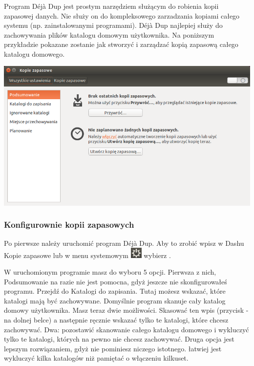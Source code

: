 Program \textcolor{ubuntu_orange}{Déjà Dup} jest prostym narzędziem służącym do robienia kopii zapasowej danych. Nie służy on do kompleksowego zarzadzania kopiami całego systemu (np. zainstalowanymi programami). Déjà Dup najlepiej służy do zachowywania plików katalogu domowym użytkownika. Na poniższym przykładzie pokazane zostanie jak stworzyć i zarządzać kopią zapasową całego katalogu domowego.

\begin{center}
	\includegraphics[width=\linewidth]{images/programy_dejavu1.png}
\end{center}

\subsubsection{Konfigurownie kopii zapasowych}
Po pierwsze należy uruchomić program Déjà Dup. Aby to zrobić wpisz w Dashu \textcolor{ubuntu_orange}{Kopie zapasowe} lub w menu systemowym \includegraphics{images/ikony_zasilanie.png} wybierz .

W uruchomionym programie masz do wyboru 5 opcji. Pierwsza z nich, \textcolor{ubuntu_orange}{Podsumowanie} na razie nie jest pomocna, gdyż jeszcze nie skonfigurowałeś programu. Przejdź do \textcolor{ubuntu_orange}{Katalogi do zapisania}. Tutaj możesz wskazać, które katalogi mają być zachowywane. Domyślnie program skanuje cały katalog domowy użytkownika. Masz teraz dwie możliwości. Skasować ten wpis (przycisk \textcolor{ubuntu_orange}{-} na dolnej belce) a następnie ręcznie wskazać tylko te katalogi, które chcesz zachowywać. Dwa: pozostawić skanowanie całego katalogu domowego i wykluczyć tylko te katalogi, których na pewno nie chcesz zachowywać. Druga opcja jest lepszym rozwiązaniem, gdyż nie pominiesz niczego istotnego. łatwiej jest wykluczyć kilka katalogów niż pamiętać o włączeniu kilkuset.

